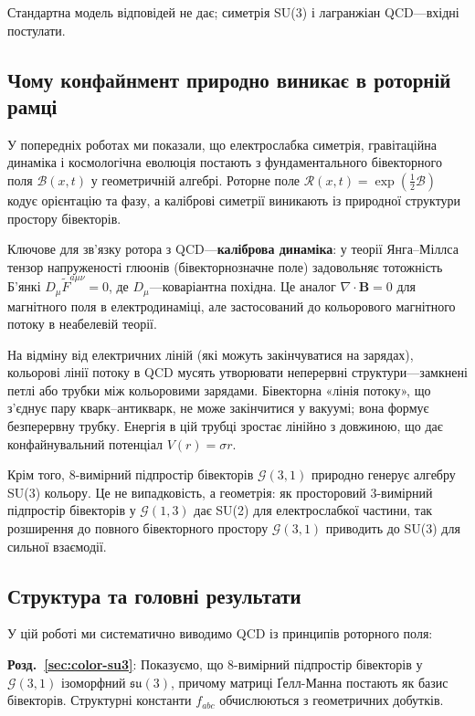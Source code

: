 \documentclass[11pt,a4paper]{article}
\newcommand{\Rotor}{\mathcal{R}}
\newcommand{\Biv}{\mathcal{B}}
\newcommand{\Cl}{\mathcal{G}}
\theoremstyle{definition}
\theoremstyle{plain}
\theoremstyle{remark}
\begin{document}
Стандартна модель відповідей не дає; симетрія SU(3) і лагранжіан QCD—вхідні постулати.

\subsection{Чому конфайнмент природно виникає в роторній рамці}

У попередніх роботах ми показали, що електрослабка симетрія, гравітаційна динаміка і космологічна еволюція постають з фундаментального бівекторного поля $\Biv(x,t)$ у геометричній алгебрі. Роторне поле $\Rotor(x,t)=\exp(\frac{1}{2}\Biv)$ кодує орієнтацію та фазу, а каліброві симетрії виникають із природної структури простору бівекторів.

Ключове для зв’язку ротора з QCD—\textbf{каліброва динаміка}: у теорії Янга–Міллса тензор напруженості глюонів (бівекторнозначне поле) задовольняє тотожність Б’янкі $D_\mu \tilde{F}^{a\mu\nu}=0$, де $D_\mu$—коваріантна похідна. Це аналог $\nabla\cdot\mathbf{B}=0$ для магнітного поля в електродинаміці, але застосований до кольорового магнітного потоку в неабелевій теорії.

На відміну від електричних ліній (які можуть закінчуватися на зарядах), кольорові лінії потоку в QCD мусять утворювати неперервні структури—замкнені петлі або трубки між кольоровими зарядами. Бівекторна «лінія потоку», що з’єднує пару кварк–антикварк, не може закінчитися у вакуумі; вона формує безперервну трубку. Енергія в цій трубці зростає лінійно з довжиною, що дає конфайнувальний потенціал $V(r)=\sigma r$.

Крім того, 8-вимірний підпростір бівекторів $\Cl(3,1)$ природно генерує алгебру SU(3) кольору. Це не випадковість, а геометрія: як просторовий 3-вимірний підпростір бівекторів у $\Cl(1,3)$ дає SU(2) для електрослабкої частини, так розширення до повного бівекторного простору $\Cl(3,1)$ приводить до SU(3) для сильної взаємодії.

\subsection{Структура та головні результати}

У цій роботі ми систематично виводимо QCD із принципів роторного поля:

\textbf{Розд.~\ref{sec:color-su3}}: Показуємо, що 8-вимірний підпростір бівекторів у $\Cl(3,1)$ ізоморфний $\mathfrak{su}(3)$, причому матриці Ґелл-Манна постають як базис бівекторів. Структурні константи $f_{abc}$ обчислюються з геометричних добутків.
\end{document}
